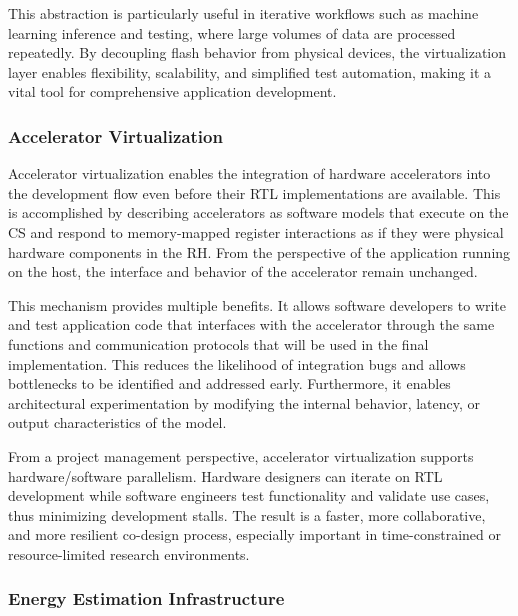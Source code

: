                     This abstraction is particularly useful in iterative workflows such as machine learning inference and testing, where large volumes of data are processed repeatedly. By decoupling flash behavior from physical devices, the virtualization layer enables flexibility, scalability, and simplified test automation, making it a vital tool for comprehensive application development.
                
                \subsubsection*{Accelerator Virtualization}
                
                    Accelerator virtualization enables the integration of hardware accelerators into the development flow even before their RTL implementations are available. This is accomplished by describing accelerators as software models that execute on the CS and respond to memory-mapped register interactions as if they were physical hardware components in the RH. From the perspective of the application running on the host, the interface and behavior of the accelerator remain unchanged.
                    
                    This mechanism provides multiple benefits. It allows software developers to write and test application code that interfaces with the accelerator through the same functions and communication protocols that will be used in the final implementation. This reduces the likelihood of integration bugs and allows bottlenecks to be identified and addressed early. Furthermore, it enables architectural experimentation by modifying the internal behavior, latency, or output characteristics of the model.
                    
                    From a project management perspective, accelerator virtualization supports hardware/software parallelism. Hardware designers can iterate on RTL development while software engineers test functionality and validate use cases, thus minimizing development stalls. The result is a faster, more collaborative, and more resilient co-design process, especially important in time-constrained or resource-limited research environments.
            
            \subsubsection{Energy Estimation Infrastructure}
            
